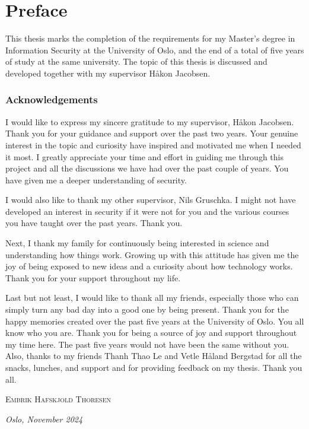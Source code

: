 \par\break\null%
\vsize%
\section*{Preface}

This thesis marks the completion of the requirements for my Master's degree in Information Security at the University of Oslo, and the end of a total of five years of study at the same university. The topic of this thesis is discussed and developed together with my supervisor Håkon Jacobsen.


\subsubsection*{Acknowledgements}

I would like to express my sincere gratitude to my supervisor, Håkon Jacobsen. Thank you for your guidance and support over the past two years. Your genuine interest in the topic and curiosity have inspired and motivated me when I needed it most. I greatly appreciate your time and effort in guiding me through this project and all the discussions we have had over the past couple of years. You have given me a deeper understanding of security.

I would also like to thank my other supervisor, Nils Gruschka. I might not have developed an interest in security if it were not for you and the various courses you have taught over the past years. Thank you.

Next, I thank my family for continuously being interested in science and understanding how things work. Growing up with this attitude has given me the joy of being exposed to new ideas and a curiosity about how technology works. Thank you for your support throughout my life.

Last but not least, I would like to thank all my friends, especially those who can simply turn any bad day into a good one by being present. Thank you for the happy memories created over the past five years at the University of Oslo. You all know who you are. Thank you for being a source of joy and support throughout my time here. The past five years would not have been the same without you. Also, thanks to my friends Thanh Thao Le and Vetle Håland Bergstad for all the snacks, lunches, and support and for providing feedback on my thesis. Thank you all.

\vfill
\hfill \textsc{Embrik Hafskjold Thoresen}

\hfill \textit{Oslo, November 2024}
\vfill
